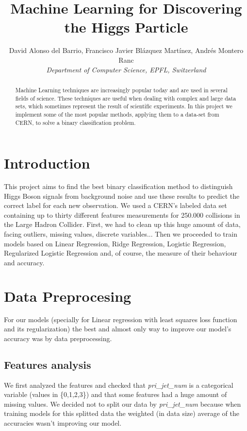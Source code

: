 \documentclass[10pt,conference,compsocconf]{IEEEtran}
\begin{document}
\title{Machine Learning for Discovering the Higgs Particle}

\author{
  David Alonso del Barrio, Francisco Javier Blázquez Martínez, Andrés Montero Ranc\\
  \textit{Department of Computer Science, EPFL, Switzerland}
}

\maketitle

\begin{abstract}
Machine Learning techniques are increasingly popular today and are used in several fields of science. These techniques are useful when dealing with complex and large data sets,  which sometimes represent the result of scientific experiments. In this project we implement some of the most popular methods, applying them to a data-set from CERN, to solve a binary classification problem.
\end{abstract}

\section{Introduction}

This project aims to find the best binary classification method to distinguish Higgs Boson signals from background noise and use these results to predict the correct label for each new observation. We used a CERN's labeled data set containing up to thirty different features measurements for 250.000 collisions in the Large Hadron Collider. First, we had to clean up this huge amount of data, facing outliers, missing values, discrete variables... Then we proceeded to train models based on Linear Regression, Ridge Regression, Logistic Regression, Regularized Logistic Regression and, of course, the measure of their behaviour and accuracy.

\section{Data Preprocesing}
For our models (specially for Linear regression with least squares loss function and its regularization) the best and almost only way to improve our model's accuracy was by data preprocessing.

\subsection{Features analysis}
We first analyzed the features and checked that \textit{pri\_jet\_num} is a categorical variable (values in \{0,1,2,3\}) and that some features had a huge amount of missing values. We decided not to split our data by \textit{pri\_jet\_num} because when training models for this splitted data the weighted (in data size) average of the accuracies wasn't improving our model.
\end{document}
